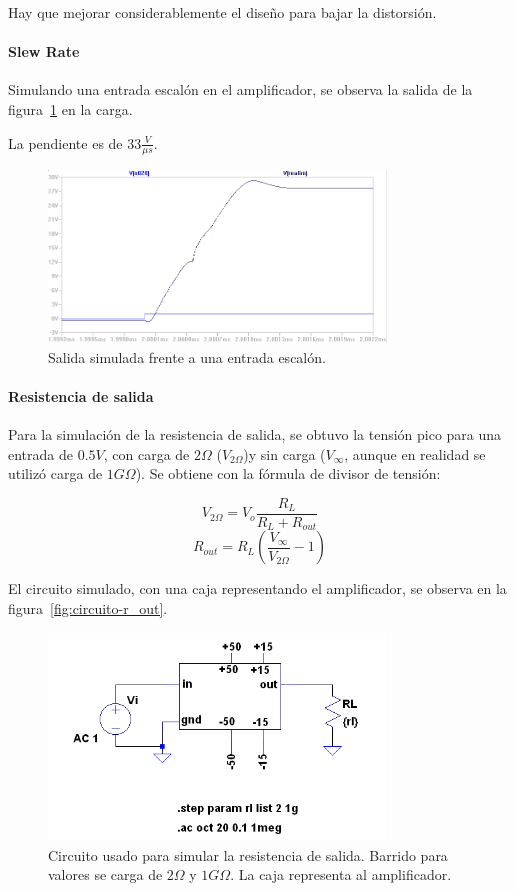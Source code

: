 \documentclass[a4paper,12pt,twoside]{article}
\begin{document}
Hay que mejorar considerablemente el diseño para bajar la distorsión.

\paragraph{Slew Rate} Simulando una entrada escalón en el amplificador, se observa la salida de la figura~\ref{fig:slew} en la carga.

La pendiente es de $33 \frac{V}{\mu s}$.


\begin{figure}[H]
	\centering
	\includegraphics[width=0.8\textwidth]{img/sim/slew}
	\caption{Salida simulada frente a una entrada escalón.}
	\label{fig:slew}
\end{figure}


\paragraph{Resistencia de salida}  

Para la simulación de la resistencia de salida, se obtuvo la tensión pico para una entrada de $0.5V$, con carga de $2\Omega$ ($V_{2\Omega}$)y sin carga ($V_{\infty}$, aunque en realidad se utilizó carga de $1G\Omega$). Se obtiene con la fórmula de divisor de tensión:

\[V_{2\Omega}=V_o \frac{R_L}{R_L+R_{out}}\]
\[R_{out}=R_L \left(\frac{V_{\infty}}{V_{2\Omega}}-1 \right)\]

El circuito simulado, con una caja representando el amplificador, se observa en la figura~\ref{fig:circuito-r_out}.


\begin{figure}[H]
	\centering
	\includegraphics[width=0.8\textwidth]{img/sim/circuito-r_out}
	\caption{Circuito usado para simular la resistencia de salida. Barrido para valores se carga de $2\Omega$ y $1G\Omega$. La caja representa al amplificador.}
	\label{fig:circuito_r-out}
\end{figure}
\end{document}
